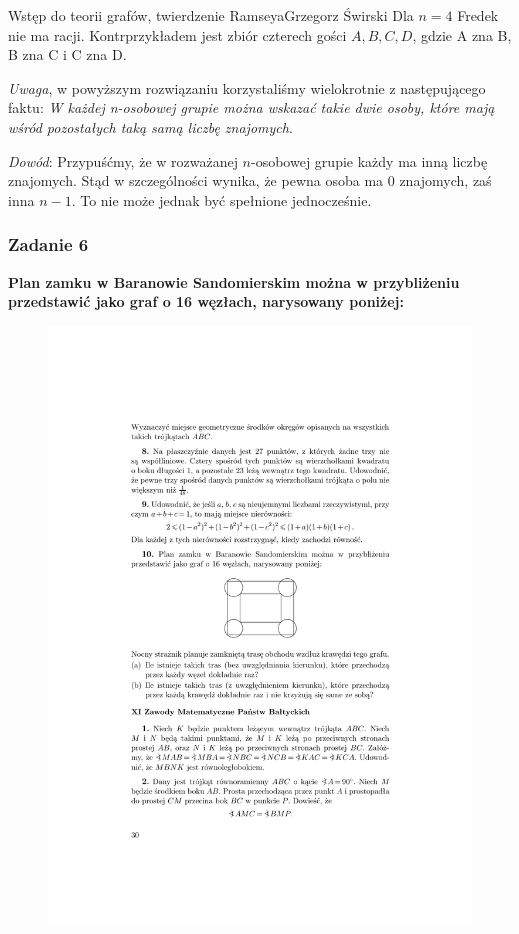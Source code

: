 \begin{referat}{Wstęp do teorii grafów, twierdzenie Ramseya}{Grzegorz Świrski}
Dla $n = 4$ Fredek nie ma racji. Kontrprzykładem jest zbiór czterech gości ${A,B,C,D}$, gdzie A zna B, B zna C i C zna D.

\emph{Uwaga}, w powyższym rozwiązaniu korzystaliśmy wielokrotnie z następującego faktu: \emph{W każdej n-osobowej grupie można wskazać takie dwie osoby, które mają wśród pozostałych taką samą liczbę znajomych}.

\emph{Dowód}: Przypuśćmy, że w rozważanej $n$-osobowej grupie każdy ma inną liczbę znajomych. Stąd w szczególności wynika, że pewna osoba ma 0 znajomych, zaś inna $n-1$. To nie może jednak być spełnione jednocześnie.


\subsubsection{Zadanie 6}
\textbf{Plan zamku w Baranowie Sandomierskim można w przybliżeniu przedstawić jako graf o 16 węzłach, narysowany poniżej:}
\begin{figure}[h]
 \centering
 \includegraphics[scale=0.6]{./swirski/castle.pdf}
\end{figure}


\end{referat}
